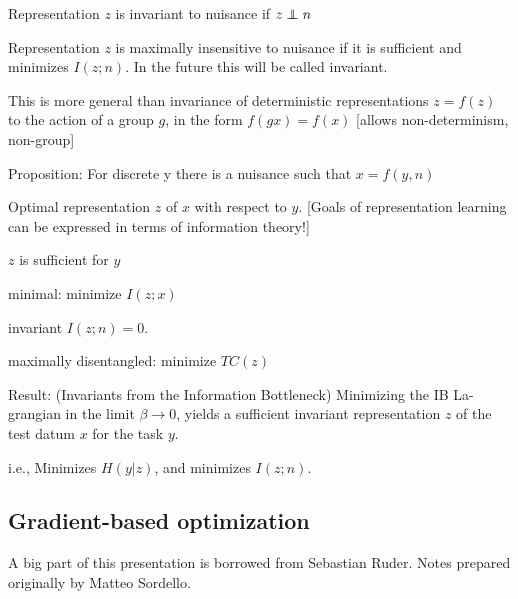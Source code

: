 \documentclass[english]{article}
\begin{document}
Representation $z$ is invariant to nuisance if $z\indep n$

Representation $z$ is maximally insensitive to nuisance if it is sufficient and minimizes $I(z;n)$. In the future this will be called invariant.

This is more general than invariance of deterministic representations $z =f(z)$ to the action of a group $g$, in the form $f(gx)=f(x)$ [allows non-determinism, non-group]

Proposition: For discrete y there is a nuisance such that $x=f(y,n)$

\item Optimal representation $z$ of $x$ with respect to $y$. [Goals of representation learning can be expressed in terms of information theory!]

\benum 
\item $z$ is sufficient for $y$


\item minimal: minimize $I(z;x)$
\item invariant $I(z;n)=0$.
\item maximally disentangled: minimize $TC(z)$

\eenum 
\item Result: (Invariants from the Information Bottleneck) Minimizing the IB La-
grangian in the limit $\beta \to 0$, yields a sufficient invariant representation $z$ of the test datum $x$ for the task $y$.

i.e., Minimizes $H(y|z)$, and  minimizes $I(z;n)$.

\eitem 


\subsection{Gradient-based optimization}

\benum 

\item A big part of this presentation is borrowed from Sebastian Ruder. Notes prepared originally by Matteo Sordello.



\end{document}
